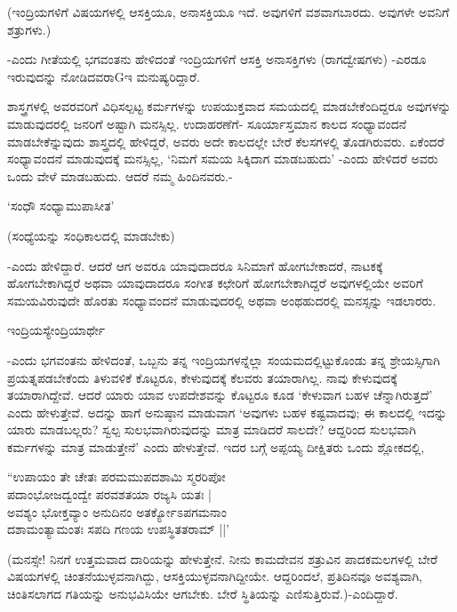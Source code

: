 (ಇಂದ್ರಿಯಗಳಿಗೆ ವಿಷಯಗಳಲ್ಲಿ ಆಸಕ್ತಿಯೂ, ಅನಾಸಕ್ತಿಯೂ ಇದೆ. ಅವುಗಳಿಗೆ ವಶವಾಗಬಾರದು. ಅವುಗಳೇ ಅವನಿಗೆ ಶತ್ರುಗಳು.)

-ಎಂದು ಗೀತೆಯಲ್ಲಿ ಭಗವಂತನು ಹೇಳಿದಂತೆ ಇಂದ್ರಿಯಗಳಿಗೆ ಆಸಕ್ತಿ ಅನಾಸಕ್ತಿಗಳು (ರಾಗದ್ವೇಷಗಳು) -ಎರಡೂ ಇರುವುದನ್ನು ನೋಡಿದವರಾGಇ ಮನುಷ್ಯರಿದ್ದಾರೆ.

ಶಾಸ್ತ್ರಗಳಲ್ಲಿ ಅವರವರಿಗೆ ವಿಧಿಸಲ್ಪಟ್ಟ ಕರ್ಮಗಳನ್ನು ಉಪಯುಕ್ತವಾದ ಸಮಯದಲ್ಲಿ ಮಾಡಬೇಕೆಂದಿದ್ದರೂ ಅವುಗಳನ್ನು ಮಾಡುವುದರಲ್ಲಿ ಜನರಿಗೆ ಅಷ್ಟಾಗಿ ಮನಸ್ಸಿಲ್ಲ. ಉದಾಹರಣೆಗೆ- ಸೂರ್ಯಾಸ್ತಮಾನ ಕಾಲದ ಸಂಧ್ಯಾವಂದನೆ ಮಾಡಬೇಕೆನ್ನುವುದು ಶಾಸ್ತ್ರದಲ್ಲಿ ಹೇಳಿದ್ದರೆ, ಅವರು ಅದೇ ಕಾಲದಲ್ಲೇ ಬೇರೆ ಕೆಲಸಗಳಲ್ಲಿ ತೊಡಗಿರುವರು. ಏಕೆಂದರೆ ಸಂಧ್ಯಾವಂದನೆ ಮಾಡುವುದಕ್ಕೆ ಮನಸ್ಸಿಲ್ಲ, `ನಿಮಗೆ ಸಮಯ ಸಿಕ್ಕಿದಾಗ ಮಾಡಬಹುದು' -ಎಂದು ಹೇಳಿದರೆ ಅವರು ಒಂದು ವೇಳೆ ಮಾಡಬಹುದು. ಆದರೆ ನಮ್ಮ ಹಿಂದಿನವರು.-

\begin{shloka}
`ಸಂಧೌ ಸಂಧ್ಯಾಮುಪಾಸೀತ'
\end{shloka}

(ಸಂಧ್ಯೆಯನ್ನು ಸಂಧಿಕಾಲದಲ್ಲಿ ಮಾಡಬೇಕು)

-ಎಂದು ಹೇಳಿದ್ದಾರೆ. ಆದರೆ ಆಗ ಅವರೂ ಯಾವುದಾದರೂ ಸಿನಿಮಾಗೆ ಹೋಗಬೇಕಾದರೆ, ನಾಟಕಕ್ಕೆ ಹೋಗಬೇಕಾಗಿದ್ದರೆ ಅಥವಾ ಯಾವುದಾದರೂ ಸಂಗೀತ ಕಛೇರಿಗೆ ಹೋಗಬೇಕಾಗಿದ್ದರೆ ಅವುಗಳಲ್ಲಿಯೇ ಅವರಿಗೆ ಸಮಯವಿರುವುದೇ ಹೊರತು ಸಂಧ್ಯಾವಂದನೆ ಮಾಡುವುದರಲ್ಲಿ ಅಥವಾ ಅಂಥಹುದರಲ್ಲಿ ಮನಸ್ಸನ್ನು ಇಡಲಾರರು.

\begin{shloka}
ಇಂದ್ರಿಯಸ್ಯೇಂದ್ರಿಯಾರ್ಥೇ
\end{shloka}

-ಎಂದು ಭಗವಂತನು ಹೇಳಿದಂತೆ, ಒಬ್ಬನು ತನ್ನ ಇಂದ್ರಿಯಗಳನ್ನೆಲ್ಲಾ ಸಂಯಮದಲ್ಲಿಟ್ಟುಕೊಂಡು ತನ್ನ ಶ್ರೇಯಸ್ಸಿಗಾಗಿ ಪ್ರಯತ್ನಪಡಬೇಕೆಂದು ತಿಳುವಳಿಕೆ ಕೊಟ್ಟರೂ, ಕೇಳುವುದಕ್ಕೆ ಕೆಲವರು ತಯಾರಾಗಿಲ್ಲ. ನಾವು ಕೇಳುವುದಕ್ಕೆ ತಯಾರಾಗಿದ್ದೇವೆ. ಆದರೆ ಯಾರು ಯಾವ ಉಪದೇಶವನ್ನು ಕೊಟ್ಟರೂ ಕೂಡ `ಕೇಳುವಾಗ ಬಹಳ ಚೆನ್ನಾಗಿರುತ್ತದೆ' ಎಂದು ಹೇಳುತ್ತೇವೆ. ಅದನ್ನು ಹಾಗೆ ಅನುಷ್ಠಾನ ಮಾಡುವಾಗ `ಅವುಗಳು ಬಹಳ ಕಷ್ಟವಾದವು; ಈ ಕಾಲದಲ್ಲಿ ಇದನ್ನು ಯಾರು ಮಾಡಬಲ್ಲರು? ಸ್ವಲ್ಪ ಸುಲಭವಾಗಿರುವುದನ್ನು ಮಾತ್ರ ಮಾಡಿದರೆ ಸಾಲದೇ? ಆದ್ದರಿಂದ ಸುಲಭವಾಗಿ ಕರ್ಮಗಳನ್ನು ಮಾತ್ರ ಮಾಡುತ್ತೇನೆ' ಎಂದು ಹೇಳುತ್ತೇವೆ. ಇದರ ಬಗ್ಗೆ ಅಪ್ಪಯ್ಯ ದೀಕ್ಷಿತರು ಒಂದು ಶ್ಲೋಕದಲ್ಲಿ,

\begin{shloka}
``ಉಪಾಯಂ ತೇ ಚೇತಃ ಪರಮಮುಪದಶಾಮಿ ಸ್ಮರರಿಪೋ\\
ಪದಾಂಭೋಜದ್ವಂದ್ವೇ ಪರವಶತಯಾ ರಜ್ಯಸಿ ಯತಃ |\\
ಅವಶ್ಯಂ ಭೋಕ್ತವ್ಯಾಂ ಅನುದಿನಂ ಅತರ್ಕ್ಯೋಽಪಗಮನಾಂ\\
ದಶಾಮಂತ್ಯಾಮಂತಃ ಸಪದಿ ಗಣಯ ಉಪಸ್ಥಿತತರಾಮ್ ||'
\end{shloka}

(ಮನಸ್ಸೇ! ನಿನಗೆ ಉತ್ತಮವಾದ ದಾರಿಯನ್ನು ಹೇಳುತ್ತೇನೆ. ನೀನು ಕಾಮದೇವನ ಶತ್ರುವಿನ ಪಾದಕಮಲಗಳಲ್ಲಿ ಬೇರೆ ವಿಷಯಗಳಲ್ಲಿ ಚಿಂತನೆಯುಳ್ಳವನಾಗಿದ್ದು, ಆಸಕ್ತಿಯುಳ್ಳವನಾಗಿದ್ದೀಯೇ. ಆದ್ದರಿಂದಲೆ, ಪ್ರತಿದಿನವೂ ಅವಶ್ಯವಾಗಿ, ಚಿಂತಿಸಲಾಗದ ಗತಿಯನ್ನು ಅನುಭವಿಸಿಯೇ ಆಗಬೇಕು. ಬೇರೆ ಸ್ಥಿತಿಯನ್ನು ಎಣಿಸುತ್ತಿರುವೆ.)-ಎಂದಿದ್ದಾರೆ.

